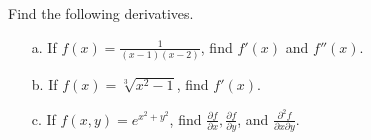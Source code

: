 {Find the following derivatives.
\begin{enumerate}
\item[a.] If $f(x)=\displaystyle \frac{1}{(x-1)(x-2)}$, find $f'(x)$ and $f''(x)$.
\item[b.] If $f(x)=\sqrt[3]{x^2-1}$, find $f'(x)$. 
\item[c.] If $f(x,y)=e^{x^2+y^2}$, find $\displaystyle \frac{\partial f}{\partial x}, \displaystyle \frac{\partial f}{\partial y}$, 
and $\displaystyle \frac{\partial^2 f}{\partial x \partial y}$.
\end{enumerate}}
{}